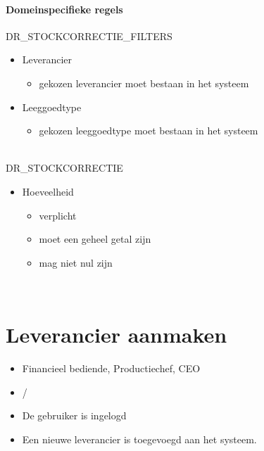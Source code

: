    \paragraph{Domeinspecifieke regels}
    DR\_STOCKCORRECTIE\_FILTERS
    \begin{itemize}
        \item Leverancier
        \begin{itemize}
            \item gekozen leverancier moet bestaan in het systeem
        \end{itemize}
        \item Leeggoedtype
        \begin{itemize}
            \item gekozen leeggoedtype moet bestaan in het systeem
        \end{itemize}
    \end{itemize}
    \\
    DR\_STOCKCORRECTIE
     \begin{itemize}
        \item Hoeveelheid
        \begin{itemize}
            \item verplicht
            \item moet een geheel getal zijn
            \item mag niet nul zijn
        \end{itemize}
    \end{itemize}
    \\

    \vspace{1cm}

\section{Leverancier aanmaken}
\label{uc:leverancier-aanmaken}

\vspace{0.5em}

\begin{itemize}[leftmargin=3.5cm, labelsep=0.5cm, nosep]
    \item[\textbf{Primaire actor:}] Financieel bediende, Productiechef, CEO
    \item[\textbf{Stakeholders:}] /
    \item[\textbf{Precondities:}] De gebruiker is ingelogd
    \item[\textbf{Postcondities:}] Een nieuwe leverancier is toegevoegd aan het systeem.
\end{itemize}

